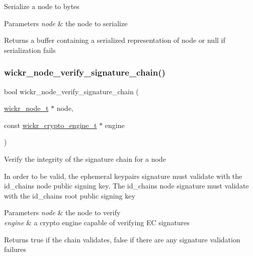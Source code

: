 Serialize a node to bytes


\begin{DoxyParams}{Parameters}
{\em node} & the node to serialize \\
\hline
\end{DoxyParams}
\begin{DoxyReturn}{Returns}
a buffer containing a serialized representation of \textquotesingle{}node\textquotesingle{} or null if serialization fails 
\end{DoxyReturn}
\mbox{\label{group__wickr__node_gac9e2d96e9109590124b2fd05a8826c1d}} 
\subsubsection{\texorpdfstring{wickr\+\_\+node\+\_\+verify\+\_\+signature\+\_\+chain()}{wickr\_node\_verify\_signature\_chain()}}
{\footnotesize\ttfamily bool wickr\+\_\+node\+\_\+verify\+\_\+signature\+\_\+chain (\begin{DoxyParamCaption}\item[{\hyperlink{structwickr__node}{wickr\+\_\+node\+\_\+t} $\ast$}]{node,  }\item[{const \hyperlink{structwickr__crypto__engine}{wickr\+\_\+crypto\+\_\+engine\+\_\+t} $\ast$}]{engine }\end{DoxyParamCaption})}

Verify the integrity of the signature chain for a node

In order to be valid, the ephemeral keypair\textquotesingle{}s signature must validate with the id\+\_\+chain\textquotesingle{}s \textquotesingle{}node\textquotesingle{} public signing key. The id\+\_\+chain\textquotesingle{}s \textquotesingle{}node\textquotesingle{} signature must validate with the id\+\_\+chain\textquotesingle{}s \textquotesingle{}root\textquotesingle{} public signing key


\begin{DoxyParams}{Parameters}
{\em node} & the node to verify \\
\hline
{\em engine} & a crypto engine capable of verifying EC signatures \\
\hline
\end{DoxyParams}
\begin{DoxyReturn}{Returns}
true if the chain validates, false if there are any signature validation failures 
\end{DoxyReturn}
